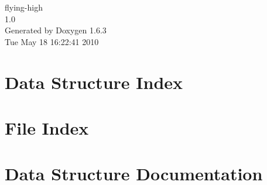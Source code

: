 \documentclass[a4paper]{book}
\begin{document}
\hypersetup{pageanchor=false}
\begin{titlepage}
\vspace*{7cm}
\begin{center}
{\Large flying-\/high \\[1ex]\large 1.0 }\\
\vspace*{1cm}
{\large Generated by Doxygen 1.6.3}\\
\vspace*{0.5cm}
{\small Tue May 18 16:22:41 2010}\\
\end{center}
\end{titlepage}
\clearemptydoublepage
{}
\tableofcontents
\clearemptydoublepage
{}
\hypersetup{pageanchor=true}
\chapter{Data Structure Index}

\chapter{File Index}

\chapter{Data Structure Documentation}
































\end{document}
